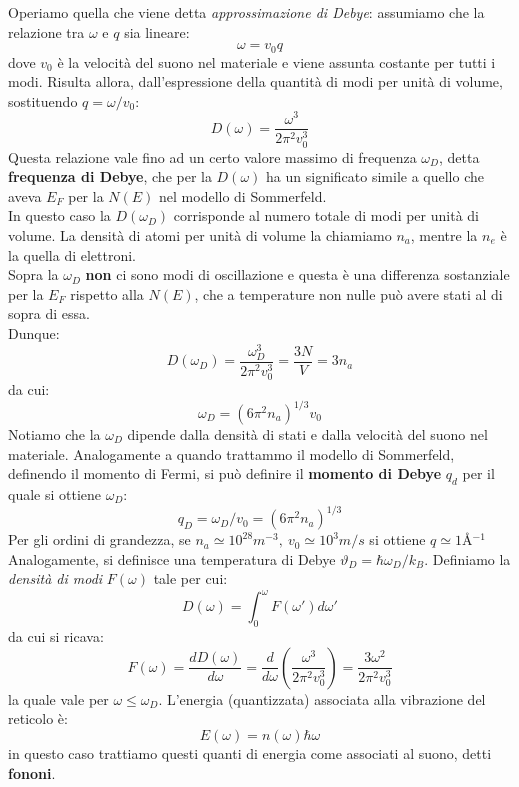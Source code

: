 \documentclass{book}
\begin{document}
            Operiamo quella che viene detta \textit{approssimazione di Debye}: assumiamo che la relazione tra $\omega$ e $q$ sia lineare:
            $$\omega  = v_{0}q$$
            dove $v_{0}$ è la velocità del suono nel materiale e viene assunta costante per tutti i modi. Risulta allora, dall'espressione della quantità di modi per unità di volume, sostituendo $q = \omega/v_{0}$:
            $$D (\omega) = \frac{\omega ^{3}}{2 \pi ^{2}v_{0}^{3}}$$
            Questa relazione vale fino ad un certo valore massimo di frequenza $\omega_{D}$, detta \textbf{frequenza di Debye}, che per la $D(\omega)$ ha un significato simile a quello che aveva $E_{F}$ per la $N(E)$ nel modello di Sommerfeld.\\
            In questo caso la $D(\omega_{D})$ corrisponde al numero totale di modi per unità di volume. La densità di atomi per unità di volume la chiamiamo $n_{a}$, mentre la $n_{e}$ è la quella di elettroni.\\
            Sopra la $\omega_{D}$ \textbf{non} ci sono modi di oscillazione e questa è una differenza sostanziale per la $E_{F}$ rispetto alla $N(E)$, che a temperature non nulle può avere stati al di sopra di essa.\\
            Dunque:
            $$D(\omega_{D}) = \frac{\omega_{D} ^{3}}{2 \pi^{2}v_{0} ^{3}} = \frac{3N}{V} = 3n_{a}$$
            da cui:
            $$\omega_{D} = (6 \pi^{2}n_{a})^{1/3}v_{0}$$
            Notiamo che la $\omega_{D}$ dipende dalla densità di stati e dalla velocità del suono nel materiale. Analogamente a quando trattammo il modello di Sommerfeld, definendo il momento di Fermi, si può definire il \textbf{momento di Debye} $q_{d}$ per il quale si ottiene $\omega_{D}$:
            $$q_{D} = \omega_{D}/v_{0} = (6 \pi^{2}n_{a})^{1/3}$$
            Per gli ordini di grandezza, se $n_{a} \simeq 10^{28}m^{-3}, \ v_{0} \simeq 10^{3}m/s$ si ottiene $q \simeq 1$\si{\angstrom}$^{-1}$
            Analogamente, si definisce una temperatura di Debye $\vartheta_{D} = \hbar \omega_{D}/k_{B}$.
            Definiamo la \textit{densità di modi} $F(\omega)$ tale per cui:
            $$D(\omega) = \int_{0} ^{\omega} F(\omega ')d \omega '$$
            da cui si ricava:
            $$F(\omega) = \frac{d D(\omega)}{d \omega} = \frac{d}{d\omega} (\frac{\omega ^{3}}{2 \pi^{2}v_{0}^{3}}) = \frac{3 \omega ^{2}}{2 \pi^{2}v_{0} ^{3}}$$
            la quale vale per $\omega \leq \omega_{D}$.
            L'energia (quantizzata) associata alla vibrazione del reticolo è:
            $$E(\omega ) = n(\omega) \hbar \omega$$
            in questo caso trattiamo questi quanti di energia come associati al suono, detti \textbf{fononi}.\\
\end{document}
